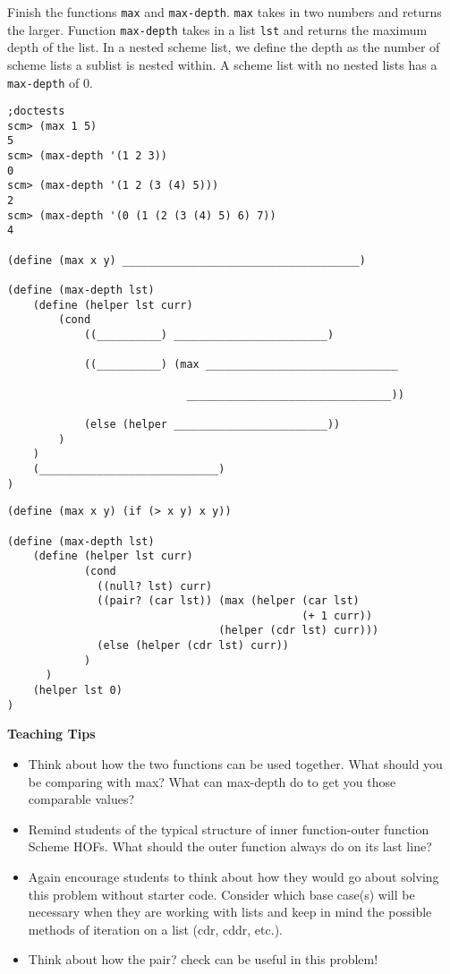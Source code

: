 \question Finish the functions \lstinline{max} and \lstinline{max-depth}. \lstinline{max} takes in two numbers and returns the larger. Function \lstinline{max-depth} takes in a list \lstinline{lst} and returns the maximum depth of the list. In a nested scheme list, we define the depth as the number of scheme lists a sublist is nested within. A scheme list with no nested lists has a \lstinline{max-depth} of 0. 

\begin{lstlisting}
;doctests
scm> (max 1 5)
5
scm> (max-depth '(1 2 3))
0
scm> (max-depth '(1 2 (3 (4) 5)))
2
scm> (max-depth '(0 (1 (2 (3 (4) 5) 6) 7))
4

(define (max x y) _____________________________________)

(define (max-depth lst)
    (define (helper lst curr)
        (cond 
            ((__________) ________________________)

            ((__________) (max ______________________________

                            ________________________________))

            (else (helper ________________________))
        )
    )
    (____________________________)
)
\end{lstlisting}

\begin{solution}[0in]
\begin{lstlisting}
(define (max x y) (if (> x y) x y))

(define (max-depth lst)
    (define (helper lst curr)
            (cond 
              ((null? lst) curr)
              ((pair? (car lst)) (max (helper (car lst) 
                                              (+ 1 curr)) 
                                 (helper (cdr lst) curr)))
              (else (helper (cdr lst) curr))
            )
      )
    (helper lst 0)
)
\end{lstlisting}
\end{solution}
\begin{questionmeta}
\textbf{Teaching Tips}
\begin{itemize}
	\item Think about how the two functions can be used together. What should you be comparing with max? What can max-depth do to get you those comparable values?
	\item Remind students of the typical structure of inner function-outer function Scheme HOFs. What should the outer function always do on its last line?
	\item Again encourage students to think about how they would go about solving this problem without starter code. Consider which base case(s) will be necessary when they are working with lists and keep in mind the possible methods of iteration on a list (cdr, cddr, etc.).
	\item Think about how the pair? check can be useful in this problem!
\end{itemize}
\end{questionmeta}